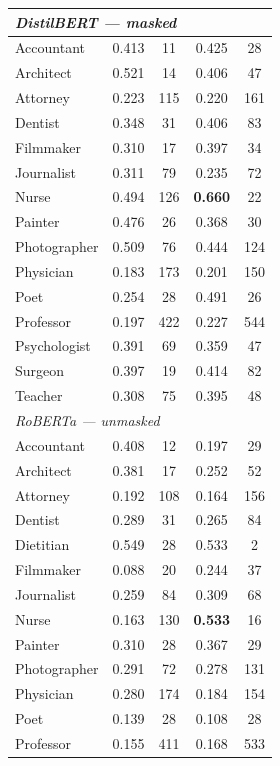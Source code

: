 \documentclass[11pt]{article}
\begin{document}
\begin{longtable}{lcccc}
\midrule
\multicolumn{5}{l}{\textit{DistilBERT --- masked}} \\
\midrule
Accountant    & 0.413 &  11 & 0.425 &  28 \\
Architect     & 0.521 &  14 & 0.406 &  47 \\
Attorney      & 0.223 & 115 & 0.220 & 161 \\
Dentist       & 0.348 &  31 & 0.406 &  83 \\
Filmmaker     & 0.310 &  17 & 0.397 &  34 \\
Journalist    & 0.311 &  79 & 0.235 &  72 \\
Nurse         & 0.494 & 126 & \textbf{0.660} & 22 \\
Painter       & 0.476 &  26 & 0.368 &  30 \\
Photographer  & 0.509 &  76 & 0.444 & 124 \\
Physician     & 0.183 & 173 & 0.201 & 150 \\
Poet          & 0.254 &  28 & 0.491 &  26 \\
Professor     & 0.197 & 422 & 0.227 & 544 \\
Psychologist  & 0.391 &  69 & 0.359 &  47 \\
Surgeon       & 0.397 &  19 & 0.414 &  82 \\
Teacher       & 0.308 &  75 & 0.395 &  48 \\
\midrule
\multicolumn{5}{l}{\textit{RoBERTa --- unmasked}} \\
\midrule
Accountant    & 0.408 &  12 & 0.197 &  29 \\
Architect     & 0.381 &  17 & 0.252 &  52 \\
Attorney      & 0.192 & 108 & 0.164 & 156 \\
Dentist       & 0.289 &  31 & 0.265 &  84 \\
Dietitian     & 0.549 &  28 & 0.533 &   2 \\
Filmmaker     & 0.088 &  20 & 0.244 &  37 \\
Journalist    & 0.259 &  84 & 0.309 &  68 \\
Nurse         & 0.163 & 130 & \textbf{0.533} & 16 \\
Painter       & 0.310 &  28 & 0.367 &  29 \\
Photographer  & 0.291 &  72 & 0.278 & 131 \\
Physician     & 0.280 & 174 & 0.184 & 154 \\
Poet          & 0.139 &  28 & 0.108 &  28 \\
Professor     & 0.155 & 411 & 0.168 & 533 \\

\end{longtable}
\end{document}
